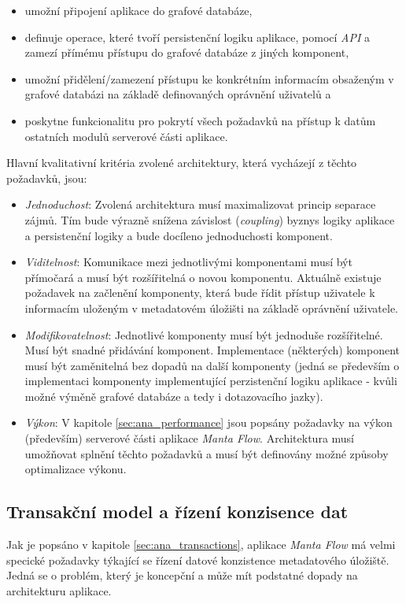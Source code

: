 \begin{itemize}
   \item umožní připojení aplikace do grafové databáze,
   \item definuje operace, které tvoří persistenční logiku aplikace, pomocí \textit{API} a zamezí přímému přístupu do grafové databáze z jiných komponent,
   \item umožní přidělení/zamezení přístupu ke konkrétním informacím obsaženým v grafové databázi na základě definovaných oprávnění uživatelů a
   \item poskytne funkcionalitu pro pokrytí všech požadavků na přístup k datům ostatních modulů serverové části aplikace.
\end{itemize}

Hlavní kvalitativní kritéria zvolené architektury, která vycházejí z těchto požadavků, jsou:

\begin{itemize}
   \item{\textit{Jednoduchost}}: Zvolená architektura musí maximalizovat princip separace zájmů. Tím bude výrazně snížena závislost (\textit{coupling}) byznys logiky aplikace a persistenční logiky a bude docíleno jednoduchosti komponent.
   \item{\textit{Viditelnost}}: Komunikace mezi jednotlivými komponentami musí být přímočará a musí být rozšířitelná o novou komponentu. Aktuálně existuje požadavek na začlenění komponenty, která bude řídit přístup uživatele k informacím uloženým v metadatovém úložišti na základě oprávnění uživatele.
   \item{\textit{Modifikovatelnost}}: Jednotlivé komponenty musí být jednoduše rozšířitelné. Musí být snadné přidávání komponent. Implementace (některých) komponent musí být zaměnitelná bez dopadů na další komponenty (jedná se především o implementaci komponenty implementující perzistenční logiku aplikace - kvůli možné výměně grafové databáze a tedy i dotazovacího jazky).
   \item{\textit{Výkon}}: V kapitole \ref{sec:ana_performance} jsou popsány požadavky na výkon (především) serverové části aplikace \textit{Manta Flow}. Architektura musí umožňovat splnění těchto požadavků a musí být definovány možné způsoby optimalizace výkonu.
\end{itemize}

\subsection{Transakční model a řízení konzisence dat}
\label{sec:des_transactions}
Jak je popsáno v kapitole \ref{sec:ana_transactions}, aplikace \textit{Manta Flow} má velmi specické požadavky týkající se řízení datové konzistence metadatového úložiště. Jedná se o problém, který je koncepční a může mít podstatné dopady na architekturu aplikace.

